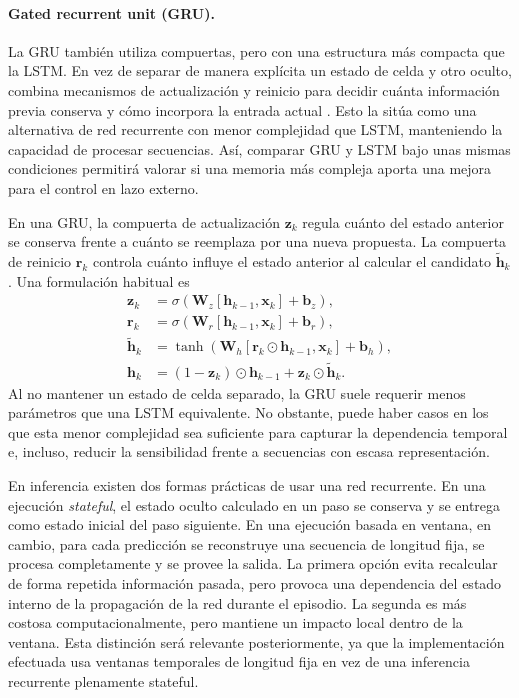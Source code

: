 \paragraph*{Gated recurrent unit (GRU).}
La GRU también utiliza compuertas, pero con una estructura más compacta que la
LSTM. En vez de separar de manera explícita un estado de celda y otro oculto,
combina mecanismos de actualización y reinicio para decidir cuánta información
previa conserva y cómo incorpora la entrada actual \cite{cho2014learning}. Esto
la sitúa como una alternativa de red recurrente con menor complejidad que LSTM,
manteniendo la capacidad de procesar secuencias. Así, comparar GRU y LSTM bajo
unas mismas condiciones permitirá valorar si una memoria más compleja aporta una
mejora para el control en lazo externo.

En una GRU, la compuerta de actualización $\bm{z}_k$ regula cuánto del estado
anterior se conserva frente a cuánto se reemplaza por una nueva propuesta. La
compuerta de reinicio $\bm{r}_k$ controla cuánto influye el estado anterior al
calcular el candidato $\tilde{\bm{h}}_k$. Una formulación habitual es
\begin{align}
  \bm{z}_k &= \sigma(\bm{W}_z[\bm{h}_{k-1},\bm{x}_k]+\bm{b}_z),\\
  \bm{r}_k &= \sigma(\bm{W}_r[\bm{h}_{k-1},\bm{x}_k]+\bm{b}_r),\\
  \tilde{\bm{h}}_k &=
    \tanh(\bm{W}_h[\bm{r}_k\odot\bm{h}_{k-1},\bm{x}_k]+\bm{b}_h),\\
  \bm{h}_k &= (1-\bm{z}_k)\odot\bm{h}_{k-1}
             +\bm{z}_k\odot\tilde{\bm{h}}_k.
\end{align}
Al no mantener un estado de celda separado, la GRU suele requerir menos
parámetros que una LSTM equivalente. No obstante, puede haber casos en los
que esta menor complejidad sea suficiente para capturar la dependencia 
temporal e, incluso, reducir la sensibilidad frente a secuencias con escasa
representación. 

En inferencia existen dos formas prácticas de usar una red recurrente. En una
ejecución \emph{stateful}, el estado oculto calculado en un paso se conserva y
se entrega como estado inicial del paso siguiente. En una ejecución
basada en ventana, en cambio, para cada predicción se reconstruye una secuencia
de longitud fija, se procesa completamente y se provee la salida. La primera 
opción evita recalcular de forma repetida información pasada, pero provoca una 
dependencia del estado interno de la propagación de la red durante el episodio. 
La segunda es más costosa computacionalmente, pero mantiene un impacto local dentro
de la ventana. Esta distinción será relevante posteriormente, ya que la implementación
efectuada usa ventanas temporales de longitud fija en vez de una inferencia recurrente
plenamente stateful.

